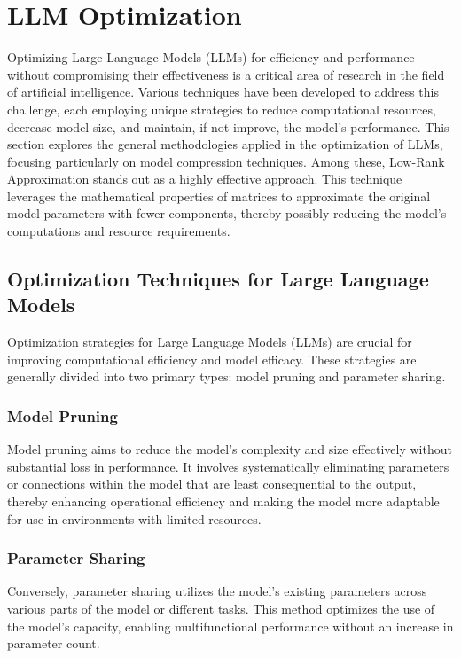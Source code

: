     



\section{LLM Optimization}
    Optimizing Large Language Models (LLMs) for efficiency and performance without compromising their effectiveness is a critical area of research in the field of artificial intelligence. Various techniques have been developed to address this challenge, each employing unique strategies to reduce computational resources, decrease model size, and maintain, if not improve, the model's performance. This section explores the general methodologies applied in the optimization of LLMs, focusing particularly on model compression techniques. Among these, Low-Rank Approximation stands out as a highly effective approach. This technique leverages the mathematical properties of matrices to approximate the original model parameters with fewer components, thereby possibly reducing the model's computations and resource requirements.

    \subsection{Optimization Techniques for Large Language Models}
        Optimization strategies for Large Language Models (LLMs) are crucial for improving computational efficiency and model efficacy. These strategies are generally divided into two primary types: model pruning and parameter sharing.

        \subsubsection{Model Pruning}
        Model pruning aims to reduce the model's complexity and size effectively without substantial loss in performance. It involves systematically eliminating parameters or connections within the model that are least consequential to the output, thereby enhancing operational efficiency and making the model more adaptable for use in environments with limited resources.

        \subsubsection{Parameter Sharing}
        Conversely, parameter sharing utilizes the model's existing parameters across various parts of the model or different tasks. This method optimizes the use of the model's capacity, enabling multifunctional performance without an increase in parameter count.

